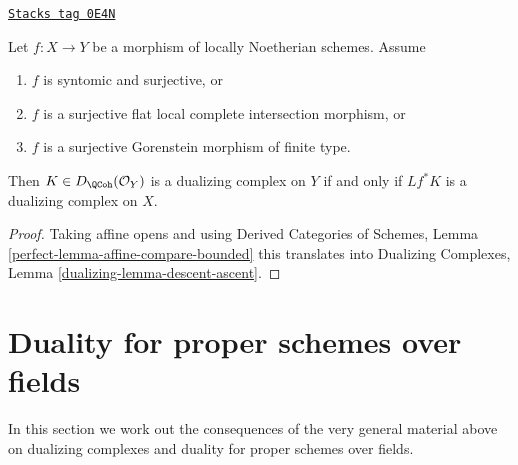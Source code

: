 \begin{lemma}
\label{duality-lemma-descent-ascent}
\href{https://stacks.math.columbia.edu/tag/0E4N}{\texttt{Stacks tag 0E4N}}

Let $f : X \to Y$ be a morphism of locally Noetherian schemes. Assume
\begin{enumerate}
\item $f$ is syntomic and surjective, or
\item $f$ is a surjective flat local complete intersection morphism, or
\item $f$ is a surjective Gorenstein morphism of finite type.
\end{enumerate}
Then $K \in D_\QCoh(\mathcal{O}_Y)$ is a dualizing complex on $Y$ if and only
if $Lf^*K$ is a dualizing complex on $X$.
\end{lemma}

\begin{proof}
Taking affine opens and using
Derived Categories of Schemes, Lemma \ref{perfect-lemma-affine-compare-bounded}
this translates into
Dualizing Complexes, Lemma \ref{dualizing-lemma-descent-ascent}.
\end{proof}

\section{Duality for proper schemes over fields}
\label{duality-section-duality-proper-over-field}
In this section we work out the consequences of the very general
material above on dualizing complexes and duality for proper schemes
over fields.

